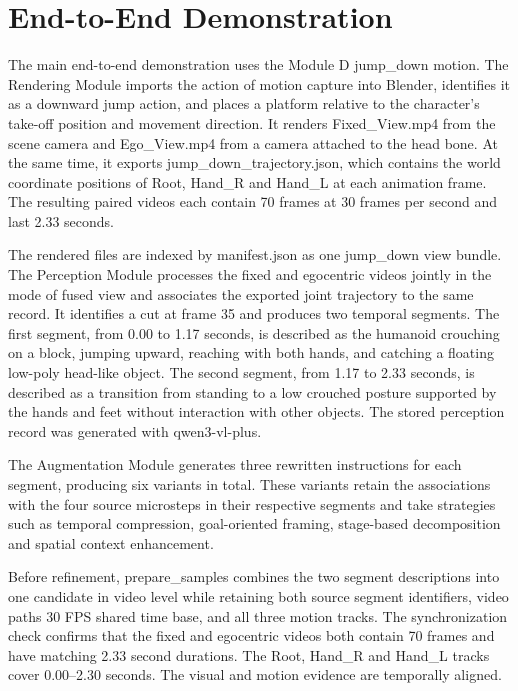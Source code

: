 \documentclass[11pt,oneside]{report}
\begin{document}
\section{End-to-End Demonstration}

The main end-to-end demonstration uses the Module D jump\_down motion. The Rendering Module imports the action of motion capture into Blender, identifies it as a downward jump action, and places a platform relative to the character’s take-off position and movement direction. It renders Fixed\_View.mp4 from the scene camera and Ego\_View.mp4 from a camera attached to the head bone. At the same time, it exports jump\_down\_trajectory.json, which contains the world coordinate positions of Root, Hand\_R and Hand\_L at each animation frame. The resulting paired videos each contain 70 frames at 30 frames per second and last 2.33 seconds.

The rendered files are indexed by manifest.json as one jump\_down view bundle. The Perception Module processes the fixed and egocentric videos jointly in the mode of fused view and associates the exported joint trajectory to the same record. It identifies a cut at frame 35 and produces two temporal segments. The first segment, from 0.00 to 1.17 seconds, is described as the humanoid crouching on a block, jumping upward, reaching with both hands, and catching a floating low-poly head-like object. The second segment, from 1.17 to 2.33 seconds, is described as a transition from standing to a low crouched posture supported by the hands and feet without interaction with other objects. The stored perception record was generated with qwen3-vl-plus.

The Augmentation Module generates three rewritten instructions for each segment, producing six variants in total. These variants retain the associations with the four source microsteps in their respective segments and take strategies such as temporal compression, goal-oriented framing, stage-based decomposition and spatial context enhancement.

Before refinement, prepare\_samples combines the two segment descriptions into one candidate in video level while retaining both source segment identifiers, video paths 30 FPS shared time base, and all three motion tracks. The synchronization check confirms that the fixed and egocentric videos both contain 70 frames and have matching 2.33 second durations. The Root, Hand\_R and Hand\_L tracks cover 0.00–2.30 seconds. The visual and motion evidence are temporally aligned.
\end{document}
